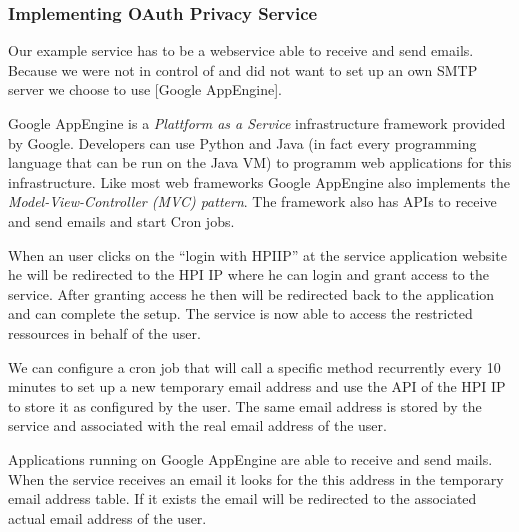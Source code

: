 \subsubsection{Implementing OAuth Privacy Service}

Our example service has to be a webservice able to receive and send
emails. Because we were not in control of and did not want to set
up an own SMTP server we choose to use [Google AppEngine].

Google AppEngine is a \emph{Plattform as a Service} infrastructure
framework provided by Google. Developers can use Python and Java
(in fact every programming language that can be run on the Java VM)
to programm web applications for this infrastructure. Like most web
frameworks Google AppEngine also implements the
\emph{Model-View-Controller (MVC) pattern}. The framework also has
APIs to receive and send emails and start Cron jobs.

When an user clicks on the ``login with HPIIP'' at the service
application website he will be redirected to the HPI IP where he
can login and grant access to the service. After granting access he
then will be redirected back to the application and can complete
the setup. The service is now able to access the restricted
ressources in behalf of the user.

We can configure a cron job that will call a specific method
recurrently every 10 minutes to set up a new temporary email
address and use the API of the HPI IP to store it as configured by
the user. The same email address is stored by the service and
associated with the real email address of the user.

Applications running on Google AppEngine are able to receive and
send mails. When the service receives an email it looks for the
this address in the temporary email address table. If it exists the
email will be redirected to the associated actual email address of
the user.
